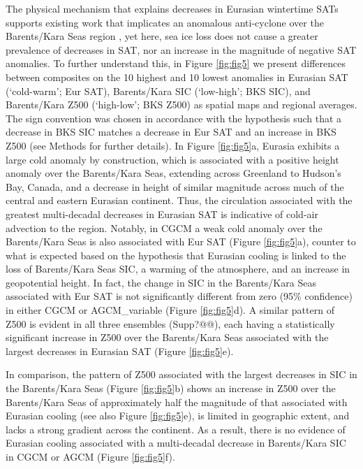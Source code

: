 \documentclass{nature}
\begin{document}
The physical mechanism that explains decreases in Eurasian wintertime SATs supports existing work that implicates an anomalous anti-cyclone over the Barents/Kara Seas region \cite{honda09,petoukhov10,mori14}, yet here, sea ice loss does not cause a greater prevalence of decreases in SAT, nor an increase in the magnitude of negative SAT anomalies. To further understand this, in Figure \ref{fig:fig5} we present differences between composites on the 10 highest and 10 lowest anomalies in Eurasian SAT (`cold-warm'; Eur SAT), Barents/Kara SIC (`low-high'; BKS SIC), and Barents/Kara Z500 (`high-low'; BKS Z500) as spatial maps and regional averages. The sign convention was chosen in accordance with the hypothesis such that a decrease in BKS SIC matches a decrease in Eur SAT and an increase in BKS Z500 (see Methods for further details). In Figure \ref{fig:fig5}a, Eurasia exhibits a large cold anomaly by construction, which is associated with a positive height anomaly over the Barents/Kara Seas, extending across Greenland to Hudson's Bay, Canada, and a decrease in height of similar magnitude across much of the central and eastern Eurasian continent. Thus, the circulation associated with the greatest multi-decadal decreases in Eurasian SAT is indicative of cold-air advection to the region. Notably, in CGCM a weak cold anomaly over the Barents/Kara Seas is also associated with Eur SAT (Figure \ref{fig:fig5}a), counter to what is expected based on the hypothesis that Eurasian cooling is linked to the loss of Barents/Kara Seas SIC, a warming of the atmosphere, and an increase in geopotential height. In fact, the change in SIC in the Barents/Kara Seas associated with Eur SAT is not significantly different from zero (95\% confidence) in either CGCM or AGCM\_variable (Figure \ref{fig:fig5}d). A similar pattern of Z500 is evident in all three ensembles (Supp?@@), each having a statistically significant increase in Z500 over the Barents/Kara Seas associated with the largest decreases in Eurasian SAT (Figure \ref{fig:fig5}e). %

In comparison, the pattern of Z500 associated with the largest decreases in SIC in the Barents/Kara Seas (Figure \ref{fig:fig5}b) shows an increase in Z500 over the Barents/Kara Seas of approximately half the magnitude of that associated with Eurasian cooling (see also Figure \ref{fig:fig5}e), is limited in geographic extent, and lacks a strong gradient across the continent. As a result, there is no evidence of Eurasian cooling associated with a multi-decadal decrease in Barents/Kara SIC in CGCM or AGCM (Figure \ref{fig:fig5}f). %
\end{document}
